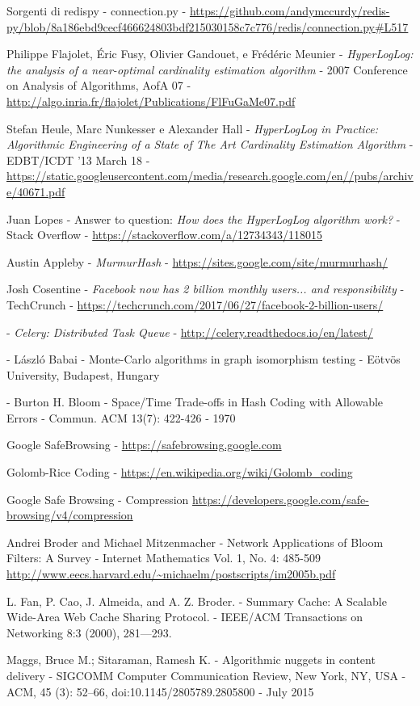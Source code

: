 \begin{thebibliography}{99}
	Sorgenti di redispy - connection.py -
	\url{https://github.com/andymccurdy/redis-py/blob/8a186ebd9cecf466624803bdf215030158c7c776/redis/connection.py\#L517}

	Philippe Flajolet, Éric Fusy, Olivier Gandouet, e Frédéric Meunier -
	\emph{HyperLogLog: the analysis of a near-optimal cardinality estimation algorithm} -
	2007 Conference on Analysis of Algorithms, AofA 07 -
	\url{http://algo.inria.fr/flajolet/Publications/FlFuGaMe07.pdf}

	Stefan Heule, Marc Nunkesser e Alexander Hall -
	\emph{HyperLogLog in Practice: Algorithmic Engineering of a State of The Art Cardinality Estimation Algorithm} -
	EDBT/ICDT ’13 March 18 - 
	\url{https://static.googleusercontent.com/media/research.google.com/en//pubs/archive/40671.pdf}

	Juan Lopes -
	Answer to question: \emph{How does the HyperLogLog algorithm work?} -
	Stack Overflow -
	\url{https://stackoverflow.com/a/12734343/118015}

	Austin Appleby -
	\emph{MurmurHash} -
	\url{https://sites.google.com/site/murmurhash/}

	Josh Cosentine -
	\emph{Facebook now has 2 billion monthly users... and responsibility} -
	TechCrunch -
	\url{https://techcrunch.com/2017/06/27/facebook-2-billion-users/}

 -
	\emph{Celery: Distributed Task Queue} -
	\url{http://celery.readthedocs.io/en/latest/}

 -
	László Babai -
 	Monte-Carlo algorithms in graph isomorphism testing -
 	Eötvös University, Budapest, Hungary

 -
	Burton H. Bloom -
	Space/Time Trade-offs in Hash Coding with Allowable Errors -
	Commun. ACM 13(7): 422-426 -
	1970

	Google SafeBrowsing -
	\url{https://safebrowsing.google.com}

	Golomb-Rice Coding -
	\url{https://en.wikipedia.org/wiki/Golomb_coding}

	Google Safe Browsing - Compression
	\url{https://developers.google.com/safe-browsing/v4/compression}

	Andrei Broder and Michael Mitzenmacher -
	Network Applications of Bloom Filters: A Survey -
	Internet Mathematics Vol. 1, No. 4: 485-509
	\url{http://www.eecs.harvard.edu/~michaelm/postscripts/im2005b.pdf}

	L. Fan, P. Cao, J. Almeida, and A. Z. Broder. -
	Summary Cache: A Scalable Wide-Area Web Cache Sharing Protocol. -
	IEEE/ACM Transactions on Networking 8:3 (2000), 281—293.

	Maggs, Bruce M.; Sitaraman, Ramesh K. -
	Algorithmic nuggets in content delivery -
	SIGCOMM Computer Communication Review, New York, NY, USA -
	ACM, 45 (3): 52–66, doi:10.1145/2805789.2805800 -
	July 2015

\end{thebibliography}
